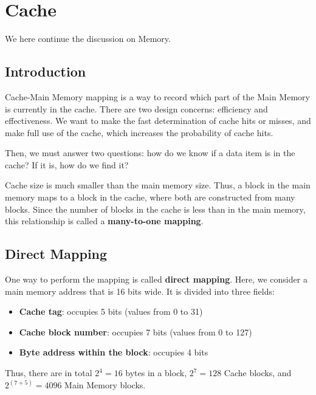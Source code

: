 \chapter{Cache}

We here continue the discussion on Memory. 

\section{Introduction}
Cache-Main Memory mapping is a way to record which part of the Main Memory is currently in the cache. There are two design concerns: efficiency and effectiveness. We want to make the fast determination of cache hits or misses, and make full use of the cache, which increases the probability of cache hits.

Then, we must answer two questions: how do we know if a data item is in the cache? If it is, how do we find it?

Cache size is much smaller than the main memory size. Thus, a block in the main memory maps to a block in the cache, where both are constructed from many blocks. Since the number of blocks in the cache is less than in the main memory, this relationship is called a \textbf{many-to-one mapping}.

\section{Direct Mapping}
One way to perform the mapping is called \textbf{direct mapping}. Here, we consider a main memory address that is 16 bits wide. It is divided into three fields:
\begin{itemize}
  \item \textbf{Cache tag}: occupies 5 bits (values from 0 to 31)
  \item \textbf{Cache block number}: occupies 7 bits (values from 0 to 127)
  \item \textbf{Byte address within the block}: occupies 4 bits
\end{itemize}

Thus, there are in total \(2^4 = 16\) bytes in a block, \(2^7 = 128\) Cache blocks, and \(2^{(7 + 5)} = 4096\) Main Memory blocks.

